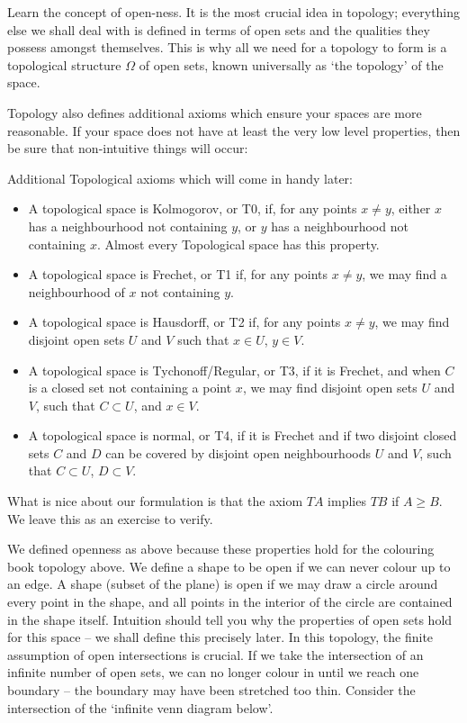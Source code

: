 Learn the concept of open-ness. It is the most crucial idea in topology; everything else we shall deal with is defined in terms of open sets and the qualities they possess amongst themselves. This is why all we need for a topology to form is a topological structure $\Omega$ of open sets, known universally as `the topology' of the space.

Topology also defines additional axioms which ensure your spaces are more reasonable. If your space does not have at least the very low level properties, then be sure that non-intuitive things will occur:

\begin{definition}
Additional Topological axioms which will come in handy later:
%
\begin{itemize}
    \item A topological space is Kolmogorov, or T0, if, for any points $x \neq y$, either $x$ has a neighbourhood not containing $y$, or $y$ has a neighbourhood not containing $x$. Almost every Topological space has this property.
    \item A topological space is Frechet, or T1 if, for any points $x \neq y$, we may find a neighbourhood of $x$ not containing $y$.
    \item A topological space is Hausdorff, or T2 if, for any points $x \neq y$, we may find disjoint open sets $U$ and $V$ such that $x \in U$, $y \in V$.
    \item A topological space is Tychonoff/Regular, or T3, if it is Frechet, and when $C$ is a closed set not containing a point $x$, we may find disjoint open sets $U$ and $V$, such that $C \subset U$, and $x \in V$.
    \item A topological space is normal, or T4, if it is Frechet and if two disjoint closed sets $C$ and $D$ can be covered by disjoint open neighbourhoods $U$ and $V$, such that $C \subset U$, $D \subset V$.
\end{itemize}
%
What is nice about our formulation is that the axiom $TA$ implies $TB$ if $A \geq B$. We leave this as an exercise to verify.
\end{definition}

We defined openness as above because these properties hold for the colouring book topology above. We define a shape to be open if we can never colour up to an edge. A shape (subset of the plane) is open if we may draw a circle around every point in the shape, and all points in the interior of the circle are contained in the shape itself. Intuition should tell you why the properties of open sets hold for this space -- we shall define this precisely later. In this topology, the finite assumption of open intersections is crucial. If we take the intersection of an infinite number of open sets, we can no longer colour in until we reach one boundary -- the boundary may have been stretched too thin. Consider the intersection of the `infinite venn diagram below'.

